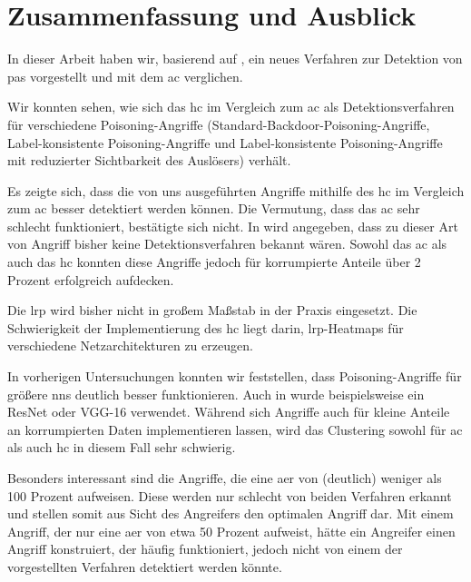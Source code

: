 \documentclass[twoside, 12pt,a4paper]{book}
\numberwithin{equation}{section}
\begin{document}
	
	
		
	
	\newpage 
	
	
	\chapter{Zusammenfassung und Ausblick} \label{chapter_conclusion}
	In dieser Arbeit haben wir, basierend auf \cite{unmaskingCH}, ein neues Verfahren zur Detektion von \acp{pa} vorgestellt und mit dem \ac{ac} verglichen.
	
	\noindent Wir konnten sehen, wie sich das \ac{hc} im Vergleich zum \ac{ac} als Detektionsverfahren für verschiedene Poisoning-Angriffe (Standard-Backdoor-Poisoning-Angriffe, Label-konsistente Poisoning-Angriffe und Label-kon\-sis\-ten\-te Poi\-so\-ning-Angriffe mit reduzierter Sichtbarkeit des Auslösers) verhält.
	
	\noindent Es zeigte sich, dass die von uns ausgeführten Angriffe mithilfe des \ac{hc} im Vergleich zum \ac{ac} besser detektiert werden können.
	\noindent Die Vermutung, dass das \ac{ac} sehr schlecht funktioniert, bestätigte sich nicht. In \cite{labelconsistent} wird angegeben, dass zu dieser Art von Angriff bisher keine Detektionsverfahren bekannt wären. Sowohl das \ac{ac} als auch das \ac{hc} konnten diese Angriffe jedoch für korrumpierte Anteile über 2 Prozent erfolgreich aufdecken.
	
	\noindent Die \ac{lrp} wird bisher nicht in großem Maßstab in der Praxis eingesetzt. Die Schwierigkeit der Implementierung des \ac{hc} liegt darin, \ac{lrp}-Heatmaps für verschiedene Netzarchitekturen zu erzeugen.
	
	\noindent In vorherigen Untersuchungen konnten wir feststellen, dass Poisoning-Angriffe für größere \acp{nn} deutlich besser funktionieren. Auch in \cite{labelconsistent} wurde beispielsweise ein ResNet \cite{resnet} oder VGG-16 \cite{vgg16} verwendet.
	Während sich Angriffe auch für kleine Anteile an korrumpierten Daten implementieren lassen, wird das Clustering sowohl für \ac{ac} als auch \ac{hc} in diesem Fall sehr schwierig.
	
	\noindent Besonders interessant sind die Angriffe, die eine \ac{aer} von (deutlich) weniger als 100 Prozent aufweisen. Diese werden nur schlecht von beiden Verfahren erkannt und stellen somit aus Sicht des Angreifers den optimalen Angriff dar. Mit einem Angriff, der nur eine \ac{aer} von etwa 50 Prozent aufweist, hätte ein Angreifer einen Angriff konstruiert, der häufig funktioniert, jedoch nicht von einem der vorgestellten Verfahren detektiert werden könnte.\\
	
\end{document}
